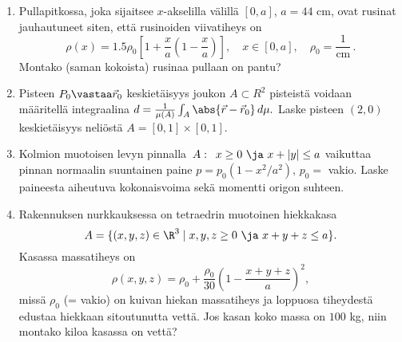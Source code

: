 \Harj
\begin{enumerate}

\item
Pullapitkossa, joka sijaitsee $x$-akselilla välillä $[0,a]$, $a=44$ cm, ovat rusinat
jauhautuneet siten, että rusinoiden viivatiheys on
\[
\rho(x) = 1.5\rho_0\left[1+\frac{x}{a}\left(1-\frac{x}{a}\right)\right], \quad 
                                              x\in[0,a], \quad \rho_0=\frac{1}{\text{cm}}\,.
\]
Montako (saman kokoista) rusinaa pullaan on pantu? 

\item 
Pisteen $P_0 \vastaa \vec r_0$ keskietäisyys joukon $A\subset R^2$ pisteistä voidaan määritellä
integraalina $d=\frac{1}{\mu(A)} \int_A \abs{\vec r - \vec r_0}\,d\mu.$ Laske pisteen $(2,0)$ 
keskietäisyys neliöstä $A=[0,1]\times [0,1].$

\item 
Kolmion muotoisen levyn pinnalla $\,A:\,\ x\ge 0\ \ja\ x+|y| \le a$ vaikuttaa pinnan normaalin
suuntainen paine $p=p_0(1-x^2/a^2),\,p_0=$ vakio. Laske paineesta aiheutuva kokonaisvoima sekä
momentti origon suhteen.

\item
Rakennuksen nurkkauksessa on tetraedrin muotoinen hiekkakasa
\[
A = \{(x,y,z)\in\R^3 \mid x,y,z \ge 0\ \ja\ x+y+z \le a\}.
\]
Kasassa massatiheys on
\[
\rho(x,y,z) = \rho_0+\frac{\rho_0}{30}\left(1-\frac{x+y+z}{a}\right)^2,
\]
missä $\rho_0$ (= vakio) on kuivan hiekan massatiheys ja loppuosa tiheydestä edustaa
hiekkaan sitoutunutta vettä. Jos kasan koko massa on $100$ kg, niin montako kiloa kasassa on
vettä?


\end{enumerate}
